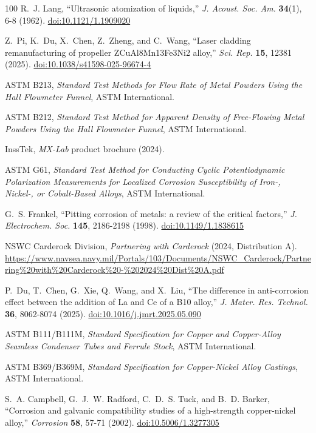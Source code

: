 \documentclass[12pt,letterpaper]{article}
\begin{document}
\begin{thebibliography}{100}
R.~J. Lang, ``Ultrasonic atomization of liquids,'' \emph{J. Acoust. Soc. Am.} \textbf{34}(1), 6-8 (1962).
\href{https://doi.org/10.1121/1.1909020}{doi:10.1121/1.1909020}

Z.~Pi, K.~Du, X.~Chen, Z.~Zheng, and C.~Wang, ``Laser cladding remanufacturing of propeller ZCuAl8Mn13Fe3Ni2 alloy,'' \emph{Sci. Rep.} \textbf{15}, 12381 (2025).
\href{https://doi.org/10.1038/s41598-025-96674-4}{doi:10.1038/s41598-025-96674-4}

ASTM B213, \emph{Standard Test Methods for Flow Rate of Metal Powders Using the Hall Flowmeter Funnel}, ASTM International.

ASTM B212, \emph{Standard Test Method for Apparent Density of Free-Flowing Metal Powders Using the Hall Flowmeter Funnel}, ASTM International.

InssTek, \emph{MX-Lab} product brochure (2024).

ASTM G61, \emph{Standard Test Method for Conducting Cyclic Potentiodynamic
Polarization Measurements for Localized Corrosion Susceptibility of Iron-,
Nickel-, or Cobalt-Based Alloys}, ASTM International.

G.~S. Frankel, ``Pitting corrosion of metals: a review of the critical
factors,'' \emph{J. Electrochem. Soc.} \textbf{145}, 2186-2198 (1998).
\href{https://doi.org/10.1149/1.1838615}{doi:10.1149/1.1838615}

NSWC Carderock Division, \emph{Partnering with Carderock} (2024, Distribution A).
\url{https://www.navsea.navy.mil/Portals/103/Documents/NSWC_Carderock/Partnering%20with%20Carderock%20-%202024%20Dist%20A.pdf}

P.~Du, T.~Chen, G.~Xie, Q.~Wang, and X.~Liu, ``The difference in
anti-corrosion effect between the addition of La and Ce of a B10 alloy,''
\emph{J. Mater. Res. Technol.} \textbf{36}, 8062-8074 (2025).
\href{https://doi.org/10.1016/j.jmrt.2025.05.090}{doi:10.1016/j.jmrt.2025.05.090}

ASTM B111/B111M, \emph{Standard Specification for Copper and Copper-Alloy
Seamless Condenser Tubes and Ferrule Stock}, ASTM International.

ASTM B369/B369M, \emph{Standard Specification for Copper-Nickel Alloy
Castings}, ASTM International.

S.~A. Campbell, G.~J.~W. Radford, C.~D.~S. Tuck, and B.~D. Barker,
``Corrosion and galvanic compatibility studies of a high-strength
copper-nickel alloy,'' \emph{Corrosion} \textbf{58}, 57-71 (2002).
\href{https://doi.org/10.5006/1.3277305}{doi:10.5006/1.3277305}


\end{thebibliography}
\end{document}
